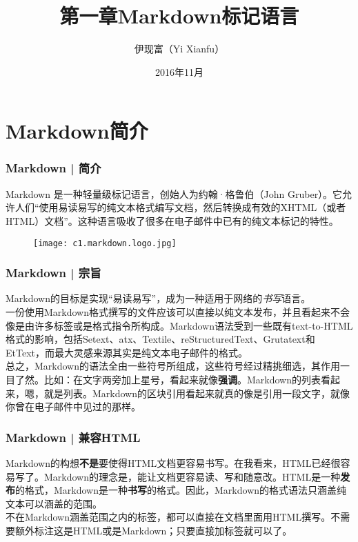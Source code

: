 



\title[Markdown]{第一章\quad Markdown标记语言}
\author[Yixf]{伊现富（Yi Xianfu）}
\date{2016年11月}



\section{Markdown简介}
\begin{frame}
  \frametitle{Markdown | 简介}
  Markdown 是一种轻量级标记语言，创始人为约翰·格鲁伯（John Gruber）。它允许人们“使用易读易写的纯文本格式编写文档，然后转换成有效的XHTML（或者HTML）文档”。这种语言吸收了很多在电子邮件中已有的纯文本标记的特性。
  \begin{figure}
    \centering
    \texttt{[image: c1.markdown.logo.jpg]}
  \end{figure}
\end{frame}

\begin{frame}
  \frametitle{Markdown | 宗旨}
  Markdown的目标是实现“易读易写”，成为一种适用于网络的\textit{书写}语言。\\
  \vspace{1em}
一份使用Markdown格式撰写的文件应该可以直接以纯文本发布，并且看起来不会像是由许多标签或是格式指令所构成。Markdown语法受到一些既有text-to-HTML格式的影响，包括Setext、atx、Textile、reStructuredText、Grutatext和EtText，而最大灵感来源其实是纯文本电子邮件的格式。\\
  \vspace{1em}
总之，Markdown的语法全由一些符号所组成，这些符号经过精挑细选，其作用一目了然。比如：在文字两旁加上星号，看起来就像\textbf{强调}。Markdown的列表看起来，嗯，就是列表。Markdown的区块引用看起来就真的像是引用一段文字，就像你曾在电子邮件中见过的那样。
\end{frame}

\begin{frame}
  \frametitle{Markdown | 兼容HTML}
Markdown的构想\textbf{不是}要使得HTML文档更容易书写。在我看来，HTML已经很容易写了。Markdown的理念是，能让文档更容易读、写和随意改。HTML是一种\textbf{发布}的格式，Markdown是一种\textbf{书写}的格式。因此，Markdown的格式语法只涵盖纯文本可以涵盖的范围。\\
  \vspace{1em}
不在Markdown涵盖范围之内的标签，都可以直接在文档里面用HTML撰写。不需要额外标注这是HTML或是Markdown；只要直接加标签就可以了。
\end{frame}

